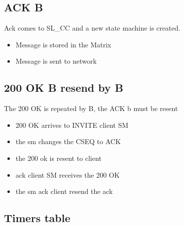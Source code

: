 \documentclass[a4paper]{article}
\begin{document}
\subsection{ACK B}
Ack comes to SL\_CC and a new state machine is created.
\begin {itemize}
\item Message is stored in the Matrix 
\item Message is sent to network
\end{itemize}

\subsection{200 OK B resend by B}
The 200 OK is repeated by B, the ACK b must be resent
\begin{itemize}
\item 200 OK arrives to INVITE client SM
\item the sm changes the CSEQ to ACK
\item the 200 ok is resent to client
\item ack client SM receives the 200 OK
\item the sm ack client resend the ack
\end{itemize}

\subsection{Timers table}
\end{document}
